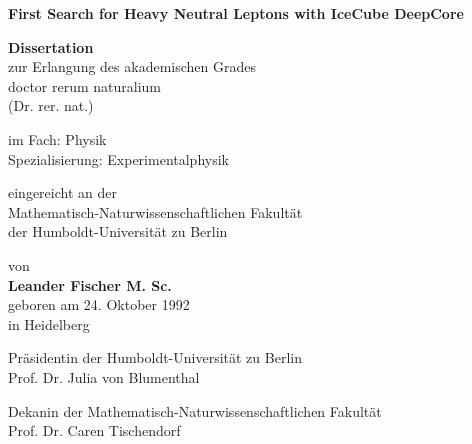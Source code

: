 \thispagestyle{plain}
\begin{center}
	\vspace*{1cm}

	\LARGE
	\textbf{First Search for Heavy Neutral Leptons with IceCube DeepCore}
	\large

	\vspace{0.8cm}

	\textbf{Dissertation}\\
	zur Erlangung des akademischen Grades\\
	doctor rerum naturalium \\
	(Dr. rer. nat.) \\

	\vspace{0.5cm}

	im Fach: Physik \\
	Spezialisierung: Experimentalphysik\\

	\vspace{0.5cm}

	eingereicht an der \\
	Mathematisch-Naturwissenschaftlichen Fakultät\\
	der Humboldt-Universität zu Berlin\\

	\vspace{0.5cm}

	von\\
	\textbf{Leander Fischer M. Sc.}\\
	geboren am 24. Oktober 1992\\
	in Heidelberg

	\vspace{0.5cm}

	Präsidentin der Humboldt-Universität zu Berlin \\
	Prof. Dr. Julia von Blumenthal \\

	\vspace{0.5cm}

	Dekanin der Mathematisch-Naturwissenschaftlichen Fakultät \\
	Prof. Dr. Caren Tischendorf \\
\end{center}

\newpage
\thispagestyle{plain}

